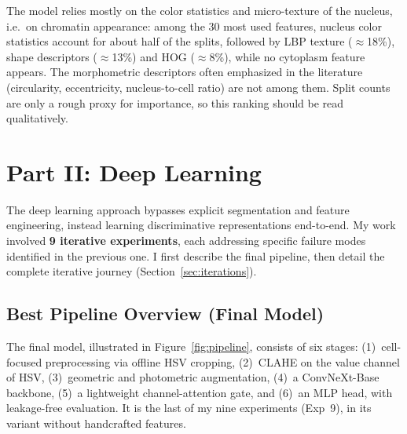 \documentclass[twocolumn,a4paper]{article}
\begin{document}
The model relies mostly on the color statistics and micro-texture of the nucleus, i.e.\ on chromatin appearance: among the 30 most used features, nucleus color statistics account for about half of the splits, followed by LBP texture ($\approx$18\%), shape descriptors ($\approx$13\%) and HOG ($\approx$8\%), while no cytoplasm feature appears. The morphometric descriptors often emphasized in the literature (circularity, eccentricity, nucleus-to-cell ratio) are not among them. Split counts are only a rough proxy for importance, so this ranking should be read qualitatively.

\section{Part II: Deep Learning}

The deep learning approach bypasses explicit segmentation and feature engineering, instead learning discriminative representations end-to-end. My work involved \textbf{9 iterative experiments}, each addressing specific failure modes identified in the previous one. I first describe the final pipeline, then detail the complete iterative journey (Section~\ref{sec:iterations}).

\subsection{Best Pipeline Overview (Final Model)}
\label{sec:final}

The final model, illustrated in Figure~\ref{fig:pipeline}, consists of six stages: (1)~cell-focused preprocessing via offline HSV cropping, (2)~CLAHE on the value channel of HSV, (3)~geometric and photometric augmentation, (4)~a ConvNeXt-Base backbone, (5)~a lightweight channel-attention gate, and (6)~an MLP head, with leakage-free evaluation. It is the last of my nine experiments (Exp~9), in its variant without handcrafted features.
\end{document}
